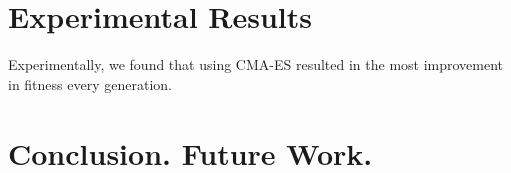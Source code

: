 \documentclass[12pt]{article}
\begin{document}
\section{Experimental Results}
\label{results}

Experimentally, we found that using CMA-ES resulted in the most improvement in fitness every generation.

\section{Conclusion. Future Work.}
\label{conclusion}

\renewcommand{\refname}{\section{References}}


\end{document}
